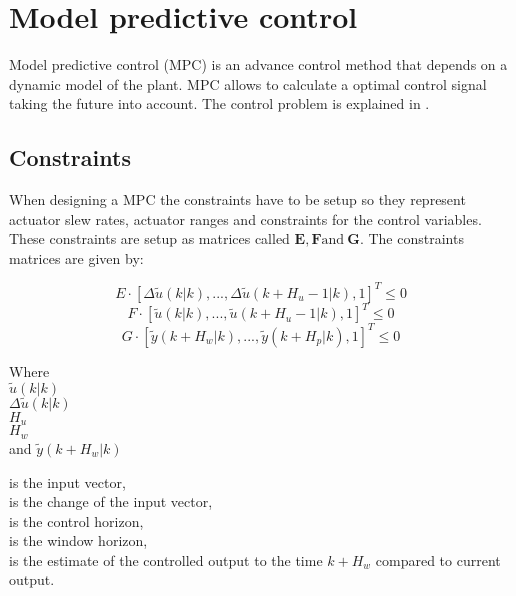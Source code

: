 \section{Model predictive control}

Model predictive control (MPC) is an advance control method that depends on a dynamic model of the plant. MPC allows to calculate a optimal control signal taking the future into account. The control problem is explained in .

\subsection{Constraints}

When designing a MPC the constraints have to be setup so they represent actuator slew rates, actuator ranges and constraints for the control variables. These constraints are setup as matrices called $\pmb{E}, \pmb{F} \text{and} \:\pmb{G}$. The constraints matrices are given by: 

\begin{equation}
E \cdot [\Delta\tilde u(k|k),...,\Delta\tilde u(k+H_u-1|k),1]^T \leq 0 
\label{eq:slewrate}
\end{equation}
\begin{equation}
F \cdot [\tilde u(k|k),...,\tilde u(k+H_u-1|k),1]^T \leq 0 
\label{eq:actranges}
\end{equation}
\begin{equation}
G \cdot [\tilde y(k+H_w|k),...,\tilde y(k+H_p|k),1]^T \leq 0
\label{eq:controlvar}
\end{equation}


 \begin{minipage}[t]{0.20\textwidth}
 Where\\
 \hspace*{8mm} $\tilde u(k|k)$ \\
 \hspace*{8mm} $\Delta\tilde u(k|k)$ \\
 \hspace*{8mm} $H_u$ \\
 \hspace*{8mm} $H_w$ \\
 and \hspace*{0.7mm} $\tilde y(k+H_w|k)$	
 \end{minipage}
 \begin{minipage}[t]{0.68\textwidth}
 \vspace*{2mm}
 is the input vector, \\
 is the change of the input vector, \\
 is the control horizon, \\
 is the window horizon, \\
 is the estimate of the controlled output to the time $k+H_w$ compared to current output.
 \end{minipage}


